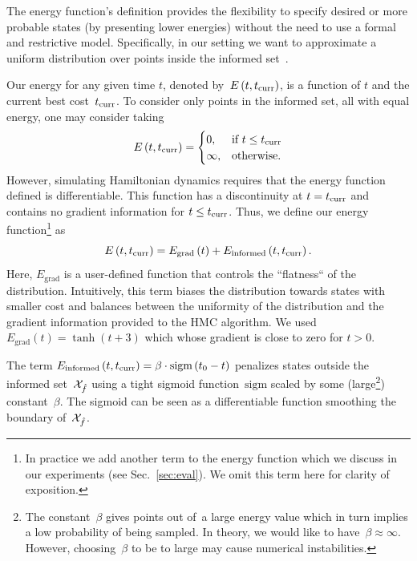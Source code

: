 \documentclass[letterpaper, 10 pt, conference]{ieeeconf}  %
\begin{document}
The energy function's definition provides the flexibility to specify desired or more probable states (by presenting lower energies) without the need to use a formal and restrictive model. 
Specifically, in our setting we want to approximate 
a uniform distribution over points inside the informed set~\Cinf.

Our energy for any given time $t$, 
denoted by~$E\left(t,t_{\rm{curr}} \right)$, 
is a function of $t$ and the current best cost~$t_{\rm{curr}}$.
To consider only points in the informed set, all with equal energy, one may consider taking 
$$
E\left(t,t_{\rm{curr}} \right) = 
\begin{cases}
    0,	& \text{if } t \leq t_{\rm{curr}}\\        
    \infty,  	& \text{otherwise}.
\end{cases}
$$
However, simulating Hamiltonian dynamics requires that the energy function defined is differentiable.
This function has a discontinuity at $t = t_{\rm{curr}}$ 
and contains no gradient information for $t \leq t_{\rm{curr}}$.
Thus, we define our energy function\footnote{In practice we add another term to the energy function which we discuss in our experiments (see Sec.~\ref{sec:eval}). We omit this term here for clarity of exposition.} as  
\begin{equation}
\label{eq:energy}
E\left( t, t_{\rm{curr}} \right) 
= 
E_{\text{grad}} \left( t \right) + 
E_{\text{informed}} \left( t,t_{\rm{curr}} \right).
\end{equation}
Here, $E_{\text{grad}}$ is a user-defined function that
controls the ``flatness`` of the distribution.
Intuitively, this term biases the distribution towards states with smaller cost and balances between the uniformity of the distribution and the gradient information provided to the HMC algorithm.
We used $E_{\text{grad}} (t) = \tanh(t + 3 )$ which whose gradient is close to zero for $t>0$.

The term 
$E_{\text{informed}} \left( t,t_{\rm{curr}} \right) 
= \beta \cdot \text{sigm}\left(t_0 - t\right)
$
penalizes states outside the informed set~$\mathcal{X}_{\hat{f}}$ using a tight sigmoid function~$\text{sigm}$ scaled by some (large\footnote{The constant~$\beta$ gives points out of~\Cinf a large energy value which in turn implies a low probability of being sampled. In theory, we would like to have~$\beta \approx \infty$. However, choosing~$\beta$ to be to large may cause numerical instabilities.}) constant~$\beta$.
The sigmoid can be seen as a differentiable function smoothing the boundary of~$\mathcal{X}_{\hat{f}}$.

\end{document}
